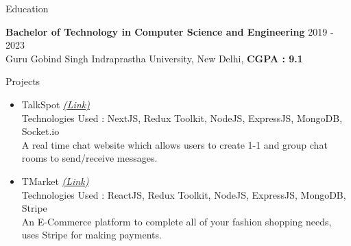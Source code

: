 \documentclass{resume} %
\begin{document}

\begin{rSection}{Education}

{\bf Bachelor of Technology in Computer Science and Engineering} \hfill {2019 - 2023}
\\ 
{\normalfont Guru Gobind Singh Indraprastha University, New Delhi}, \textbf{CGPA : 9.1}


\end{rSection}
 


\begin{rSection}{Projects}
   \begin{itemize}

    \item TalkSpot
   \href{https://github.com/tushargahlaut/talkspot-chat-app}{\emph{(Link)}} 
   \\Technologies Used : NextJS, Redux Toolkit, NodeJS, ExpressJS, MongoDB, Socket.io 
   \\{\normalfont A real time chat website which allows users to create 1-1 and group chat rooms to send/receive messages.}
   
   \item TMarket
   \href{https://github.com/tushargahlaut/TMarket}{\emph{(Link)}}
   \\Technologies Used : ReactJS, Redux Toolkit, NodeJS, ExpressJS, MongoDB, Stripe
   \\{\normalfont An E-Commerce platform to complete all of your fashion shopping needs, uses Stripe for making payments.}
   
   \end{itemize}
\end{rSection}
\end{document}
